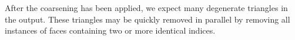 \documentclass[10pt,journal,cspaper,compsoc]{IEEEtran}
\begin{document}


After the coarsening has been applied, we expect many degenerate triangles
in the output. These triangles may be quickly removed in parallel by
removing all instances of faces containing two or more identical indices.
\end{document}
